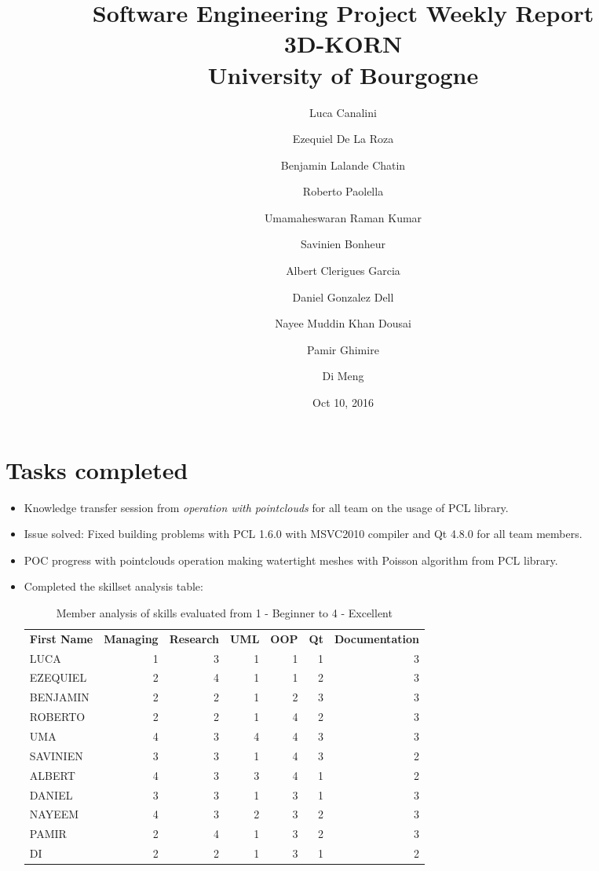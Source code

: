 \documentclass[11pt]{article} %
\title{Software Engineering Project Weekly Report\\ \textbf{3D-KORN} \\ University of Bourgogne}
\author{Luca Canalini \and Ezequiel De La Roza \and Benjamin Lalande Chatin \and Roberto Paolella \and Umamaheswaran Raman Kumar \and Savinien Bonheur \and Albert Clerigues Garcia \and Daniel Gonzalez Dell \and Nayee Muddin Khan Dousai \and Pamir Ghimire \and Di Meng
}
\date{Oct 10, 2016} %
\begin{document}
\maketitle
\newpage

\section{Tasks completed}
\begin{itemize}
	\item Knowledge transfer session from \emph{operation with pointclouds} for all team on the usage of PCL library.
	
	\item Issue solved: Fixed building problems	with PCL 1.6.0 with MSVC2010 compiler and Qt 4.8.0 for all team members.
	
	\item POC progress with pointclouds operation making watertight meshes with Poisson algorithm from PCL library.
	
	\item Completed the skillset analysis table:
\begin{table}[h]
	\centering
	\label{my-label}
	\begin{tabular}{lrrrrrr}
		\textbf{First Name}   & \textbf{Managing} & \textbf{Research} & \textbf{UML} & \textbf{OOP} & \textbf{Qt} & \textbf{Documentation} \\
		LUCA       & 1                  & 3        & 1   & 1   & 1         & 3             \\
		EZEQUIEL   & 2                  & 4        & 1   & 1   & 2         & 3             \\
		BENJAMIN   & 2                  & 2        & 1   & 2   & 3         & 3             \\
		ROBERTO    & 2                  & 2        & 1   & 4   & 2         & 3             \\
		UMA        & 4                  & 3        & 4   & 4   & 3         & 3             \\
		SAVINIEN   & 3                  & 3        & 1   & 4   & 3         & 2             \\
		ALBERT     & 4                  & 3        & 3   & 4   & 1         & 2             \\
		DANIEL     & 3                  & 3        & 1   & 3   & 1         & 3             \\
		NAYEEM     & 4                  & 3        & 2   & 3   & 2         & 3             \\
		PAMIR      & 2                  & 4        & 1   & 3   & 2         & 3             \\
		DI         & 2                  & 2        & 1   & 3   & 1         & 2                    
	\end{tabular}
\caption{Member analysis of skills evaluated from 1 - Beginner to 4 - Excellent}
\end{table}
	

\end{itemize}
\end{document}
